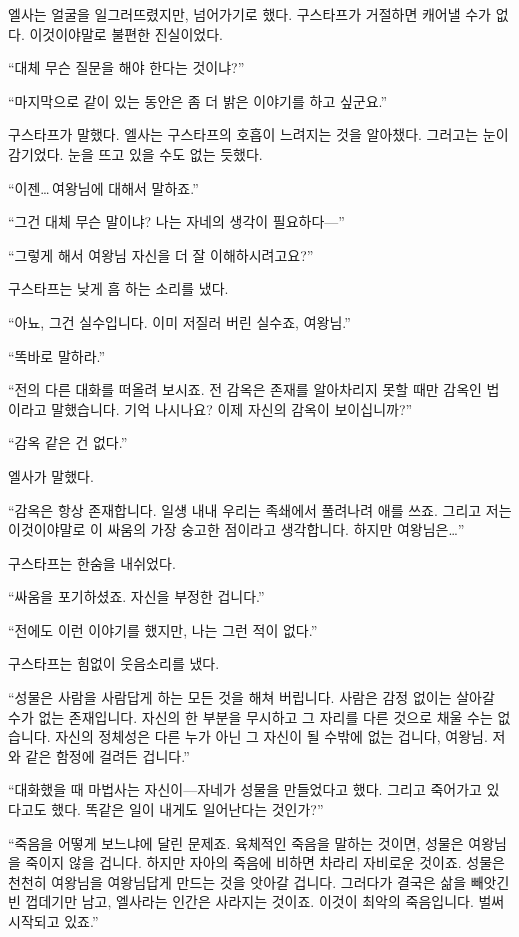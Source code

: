 엘사는 얼굴을 일그러뜨렸지만, 넘어가기로 했다. 구스타프가 거절하면 캐어낼 수가 없다. 이것이야말로 불편한 진실이었다.

``대체 무슨 질문을 해야 한다는 것이냐?''

``마지막으로 같이 있는 동안은 좀 더 밝은 이야기를 하고 싶군요.''

구스타프가 말했다. 엘사는 구스타프의 호흡이 느려지는 것을 알아챘다. 그러고는 눈이 감기었다. 눈을 뜨고 있을 수도 없는 듯했다.

``이젠\ldots\,여왕님에 대해서 말하죠.''

``그건 대체 무슨 말이냐? 나는 자네의 생각이 필요하다—''

``그렇게 해서 여왕님 자신을 더 잘 이해하시려고요?''

구스타프는 낮게 흠 하는 소리를 냈다.

``아뇨, 그건 실수입니다. 이미 저질러 버린 실수죠, 여왕님.''

``똑바로 말하라.''

``전의 다른 대화를 떠올려 보시죠. 전 감옥은 존재를 알아차리지 못할 때만 감옥인 법이라고 말했습니다. 기억 나시나요? 이제 자신의 감옥이 보이십니까?''

``감옥 같은 건 없다.''

엘사가 말했다.

``감옥은 항상 존재합니다. 일섕 내내 우리는 족쇄에서 풀려나려 애를 쓰죠. 그리고 저는 이것이야말로 이 싸움의 가장 숭고한 점이라고 생각합니다. 하지만 여왕님은\ldots''

구스타프는 한숨을 내쉬었다.

``싸움을 포기하셨죠. 자신을 부정한 겁니다.''

``전에도 이런 이야기를 했지만, 나는 그런 적이 없다.''

구스타프는 힘없이 웃음소리를 냈다.

``성물은 사람을 사람답게 하는 모든 것을 해쳐 버립니다. 사람은 감정 없이는 살아갈 수가 없는 존재입니다. 자신의 한 부분을 무시하고 그 자리를 다른 것으로 채울 수는 없습니다. 자신의 정체성은 다른 누가 아닌 그 자신이 될 수밖에 없는 겁니다, 여왕님. 저와 같은 함정에 걸려든 겁니다.''

`` 대화했을 때 마법사는 자신이—자네가 성물을 만들었다고 했다. 그리고 죽어가고 있다고도 했다. 똑같은 일이 내게도 일어난다는 것인가?''

``죽음을 어떻게 보느냐에 달린 문제죠. 육체적인 죽음을 말하는 것이면, 성물은 여왕님을 죽이지 않을 겁니다. 하지만 자아의 죽음에 비하면 차라리 자비로운 것이죠. 성물은 천천히 여왕님을 여왕님답게 만드는 것을 앗아갈 겁니다. 그러다가 결국은 삶을 빼앗긴 빈 껍데기만 남고, 엘사라는 인간은 사라지는 것이죠. 이것이 최악의 죽음입니다. 벌써 시작되고 있죠.''

